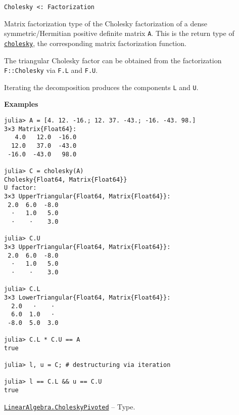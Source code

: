 \begin{adjustwidth}{2em}{0pt}


\begin{verbatim}
Cholesky <: Factorization
\end{verbatim}

Matrix factorization type of the Cholesky factorization of a dense symmetric/Hermitian positive definite matrix \texttt{A}. This is the return type of \hyperlink{7653413936706994771}{\texttt{cholesky}}, the corresponding matrix factorization function.

The triangular Cholesky factor can be obtained from the factorization \texttt{F::Cholesky} via \texttt{F.L} and \texttt{F.U}.

Iterating the decomposition produces the components \texttt{L} and \texttt{U}.

\textbf{Examples}


\begin{verbatim}
julia> A = [4. 12. -16.; 12. 37. -43.; -16. -43. 98.]
3×3 Matrix{Float64}:
   4.0   12.0  -16.0
  12.0   37.0  -43.0
 -16.0  -43.0   98.0

julia> C = cholesky(A)
Cholesky{Float64, Matrix{Float64}}
U factor:
3×3 UpperTriangular{Float64, Matrix{Float64}}:
 2.0  6.0  -8.0
  ⋅   1.0   5.0
  ⋅    ⋅    3.0

julia> C.U
3×3 UpperTriangular{Float64, Matrix{Float64}}:
 2.0  6.0  -8.0
  ⋅   1.0   5.0
  ⋅    ⋅    3.0

julia> C.L
3×3 LowerTriangular{Float64, Matrix{Float64}}:
  2.0   ⋅    ⋅
  6.0  1.0   ⋅
 -8.0  5.0  3.0

julia> C.L * C.U == A
true

julia> l, u = C; # destructuring via iteration

julia> l == C.L && u == C.U
true
\end{verbatim}



\end{adjustwidth}
\hypertarget{9530655262094960367}{}
\hyperlink{9530655262094960367}{\texttt{LinearAlgebra.CholeskyPivoted}}  -- {Type.}

